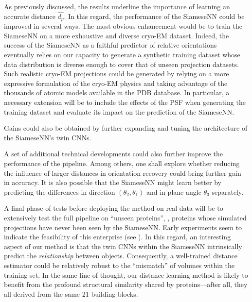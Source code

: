 As previously discussed, the results underline the importance of learning an accurate distance $\widehat{d_p}$.
In this regard, the performance of the SiameseNN could be improved in several ways.
The most obvious enhancement would be to train the SiameseNN on a more exhaustive and diverse cryo-EM dataset.
Indeed, the success of the SiameseNN as a faithful predictor of relative orientations eventually relies on our capacity to generate a synthetic training dataset whose data distribution is diverse enough to cover that of unseen projection datasets.
Such realistic cryo-EM projections could be generated by relying on a more expressive formulation of the cryo-EM physics and taking advantage of the thousands of atomic models available in the PDB database.
In particular, a necessary extension will be to include the effects of the PSF when generating the training dataset and evaluate its impact on the prediction of the SiameseNN\@.

Gains could also be obtained by further expanding and tuning the architecture of the SiameseNN's twin CNNs.

A set of additional technical developments could also further improve the performance of the pipeline. Among others, one shall explore whether reducing the influence of larger distances in orientation recovery could bring further gain in accuracy. It is also possible that the SiameseNN might learn better by predicting the differences in direction $(\theta_2,\theta_1)$ and in-plane angle $\theta_3$ separately.  

A final phase of tests before deploying the method on real data will be to extensively test the full pipeline on ``unseen proteins'', \ie, proteins whose simulated projections have never been seen by the SiameseNN\@.
Early experiments seem to indicate the feasibility of this enterprise (see ).
In this regard, an interesting aspect of our method is that the twin CNNs within the SiameseNN intrinsically predict the \textit{relationship} between objects.
Consequently, a well-trained distance estimator could be relatively robust to the ``mismatch'' of volumes within the training set.
In the same line of thought, our distance learning method is likely to benefit from the profound structural similarity shared by proteins---after all, they all derived from the same 21 building blocks.

